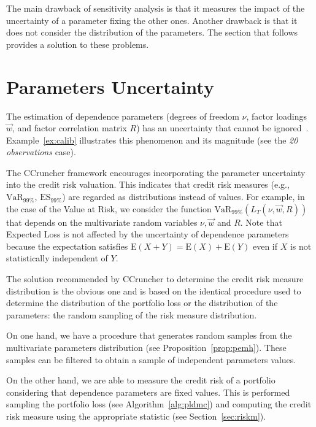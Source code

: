 \documentclass[11pt,fleqn]{book} %
\begin{document}
The main drawback of sensitivity analysis is that it measures the impact 
of the uncertainty of a parameter fixing the other ones. Another drawback 
is that it does not consider the distribution of the parameters. The 
section that follows provides a solution to these problems.

\section{Parameters Uncertainty}

The estimation of dependence parameters (degrees of freedom $\nu$, factor
loadings $\vec{w}$, and factor correlation matrix $R$) has an uncertainty 
that cannot be ignored~\cite{tarashev:2010,gossl:2005}. Example~\ref{ex:calib} 
illustrates this phenomenon and its magnitude (see the \emph{20 observations} 
case).

The CCruncher framework encourages incorporating the parameter uncertainty 
into the credit risk valuation. This indicates that credit risk measures
(e.g., $\text{VaR}_{99\%}$, $\text{ES}_{99\%}$) are regarded as distributions 
instead of values. For example, in the case of the Value at Risk, we consider
the function $\text{VaR}_{99\%}(L_T(\nu,\vec{w},R))$ that depends on 
the multivariate random variables $\nu, \vec{w}$ and $R$. Note that Expected 
Loss is not affected by the uncertainty of dependence parameters because the 
expectation satisfies $\text{E}(X+Y)=\text{E}(X)+\text{E}(Y)$ even if $X$ is 
not statistically independent of $Y$.

The solution recommended by CCruncher to determine the credit risk measure 
distribution is the obvious one and is based on the identical procedure 
used to determine the distribution of the portfolio loss or the distribution 
of the parameters: the random sampling of the risk measure distribution. 

On one hand, we have a procedure that generates random samples from the 
multivariate parameters distribution (see Proposition~\ref{prop:pemh}).
These samples can be filtered to obtain a sample of independent parameters 
values.

On the other hand, we are able to measure the credit risk of a portfolio 
considering that dependence parameters are fixed values. This is performed 
sampling the portfolio loss (see Algorithm~\ref{alg:pldmc}) and computing 
the credit risk measure using the appropriate statistic (see 
Section~\ref{sec:riskm}).
\end{document}

